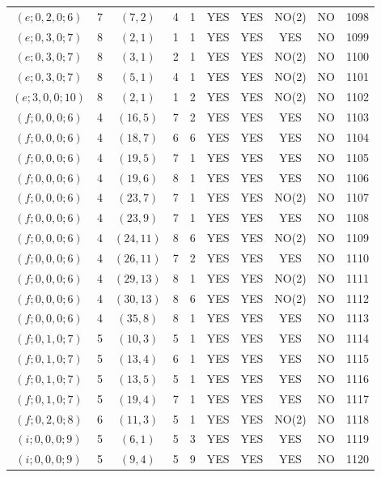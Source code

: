 \begin{longtable}{|c|c|c|c|c|c|c|c|c|c|}
$(e; 0, 2, 0; 6)$ & 7 & $(7, 2)$ & 4 & 1 & YES & YES & NO(2) & NO & 1098\\
$(e; 0, 3, 0; 7)$ & 8 & $(2, 1)$ & 1 & 1 & YES & YES & YES & NO & 1099\\
$(e; 0, 3, 0; 7)$ & 8 & $(3, 1)$ & 2 & 1 & YES & YES & NO(2) & NO & 1100\\
$(e; 0, 3, 0; 7)$ & 8 & $(5, 1)$ & 4 & 1 & YES & YES & NO(2) & NO & 1101\\
$(e; 3, 0, 0; 10)$ & 8 & $(2, 1)$ & 1 & 2 & YES & YES & NO(2) & NO & 1102\\
$(f; 0, 0, 0; 6)$ & 4 & $(16, 5)$ & 7 & 2 & YES & YES & YES & NO & 1103\\
$(f; 0, 0, 0; 6)$ & 4 & $(18, 7)$ & 6 & 6 & YES & YES & YES & NO & 1104\\
$(f; 0, 0, 0; 6)$ & 4 & $(19, 5)$ & 7 & 1 & YES & YES & YES & NO & 1105\\
$(f; 0, 0, 0; 6)$ & 4 & $(19, 6)$ & 8 & 1 & YES & YES & YES & NO & 1106\\
$(f; 0, 0, 0; 6)$ & 4 & $(23, 7)$ & 7 & 1 & YES & YES & NO(2) & NO & 1107\\
$(f; 0, 0, 0; 6)$ & 4 & $(23, 9)$ & 7 & 1 & YES & YES & YES & NO & 1108\\
$(f; 0, 0, 0; 6)$ & 4 & $(24, 11)$ & 8 & 6 & YES & YES & NO(2) & NO & 1109\\
$(f; 0, 0, 0; 6)$ & 4 & $(26, 11)$ & 7 & 2 & YES & YES & YES & NO & 1110\\
$(f; 0, 0, 0; 6)$ & 4 & $(29, 13)$ & 8 & 1 & YES & YES & NO(2) & NO & 1111\\
$(f; 0, 0, 0; 6)$ & 4 & $(30, 13)$ & 8 & 6 & YES & YES & NO(2) & NO & 1112\\
$(f; 0, 0, 0; 6)$ & 4 & $(35, 8)$ & 8 & 1 & YES & YES & YES & NO & 1113\\
$(f; 0, 1, 0; 7)$ & 5 & $(10, 3)$ & 5 & 1 & YES & YES & YES & NO & 1114\\
$(f; 0, 1, 0; 7)$ & 5 & $(13, 4)$ & 6 & 1 & YES & YES & YES & NO & 1115\\
$(f; 0, 1, 0; 7)$ & 5 & $(13, 5)$ & 5 & 1 & YES & YES & YES & NO & 1116\\
$(f; 0, 1, 0; 7)$ & 5 & $(19, 4)$ & 7 & 1 & YES & YES & YES & NO & 1117\\
$(f; 0, 2, 0; 8)$ & 6 & $(11, 3)$ & 5 & 1 & YES & YES & NO(2) & NO & 1118\\
$(i; 0, 0, 0; 9)$ & 5 & $(6, 1)$ & 5 & 3 & YES & YES & YES & NO & 1119\\
$(i; 0, 0, 0; 9)$ & 5 & $(9, 4)$ & 5 & 9 & YES & YES & YES & NO & 1120\\

\end{longtable}
